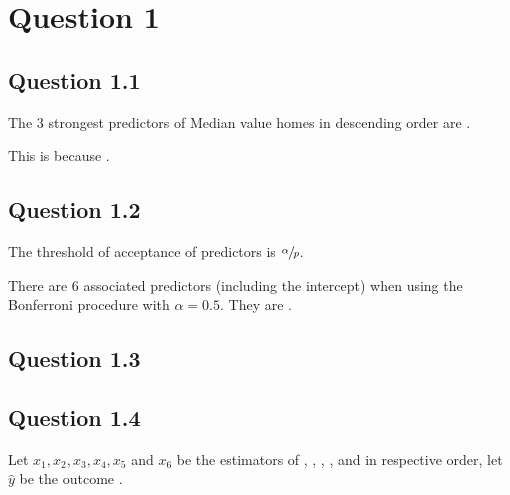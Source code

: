 \documentclass[parskip=full]{scrartcl}
\begin{document}


\pspara
\section*{Question 1}
    \subsection*{Question 1.1}

    The 3 strongest predictors of Median value homes in descending order are .
    
    This is because .

    \subsection*{Question 1.2}
    
    The threshold of acceptance of predictors is $\sfrac{\alpha}{p}$.

    There are 6 associated predictors (including the intercept) when using the Bonferroni procedure with $\alpha = 0.5$. They are .

    \subsection*{Question 1.3}
    

    \subsection*{Question 1.4}

    Let $x_1, x_2, x_3, x_4, x_5$ and $x_6$ be the estimators of , , , ,  and  in respective order, let $\hat{y}$ be the outcome .
\end{document}
